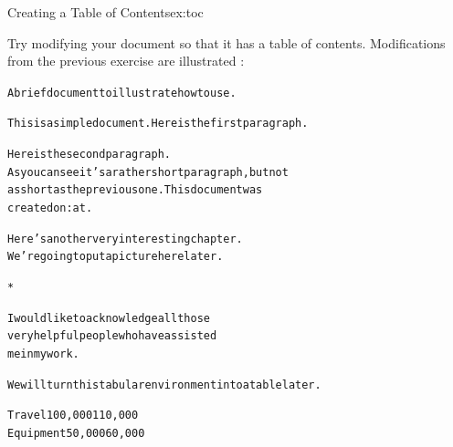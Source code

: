 \begin{exercise}{Creating a Table of Contents}{ex:toc}

Try modifying your document so that it has a table of contents.
Modifications from the previous exercise are illustrated 
:
\begin{bcode}
\begin{alltt}
\oarg{12pt}






A brief document to illustrate how to use .



This is a simple document.  Here is the first paragraph.


Here is the second paragraph. 
As you can see it's a rather short paragraph, but not 
as short as the previous one. This document was 
created on: at .


Here's another very interesting chapter.
We're going to put a picture here later.

*

I would like to acknowledge all those
very helpful people who have assisted
me in my work.


We will turn this tabular environment into a table later.

  
    
 Travel  100,000  110,000
 Equipment  50,000  60,000



\end{alltt}
\end{bcode}
\end{exercise}
